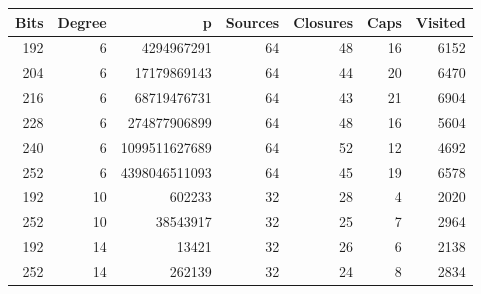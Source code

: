 \begin{tabular}{rrrrrrr}\toprule
Bits & Degree & p & Sources & Closures & Caps & Visited\\\midrule
192 & 6 & 4294967291 & 64 & 48 & 16 & 6152\\
204 & 6 & 17179869143 & 64 & 44 & 20 & 6470\\
216 & 6 & 68719476731 & 64 & 43 & 21 & 6904\\
228 & 6 & 274877906899 & 64 & 48 & 16 & 5604\\
240 & 6 & 1099511627689 & 64 & 52 & 12 & 4692\\
252 & 6 & 4398046511093 & 64 & 45 & 19 & 6578\\
192 & 10 & 602233 & 32 & 28 & 4 & 2020\\
252 & 10 & 38543917 & 32 & 25 & 7 & 2964\\
192 & 14 & 13421 & 32 & 26 & 6 & 2138\\
252 & 14 & 262139 & 32 & 24 & 8 & 2834\\
\bottomrule\end{tabular}
